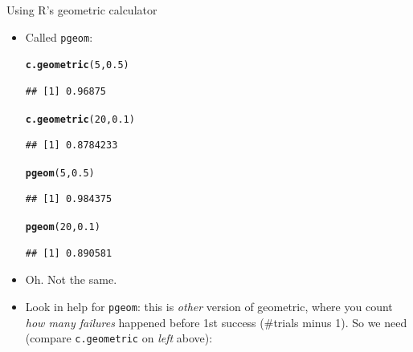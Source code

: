 \documentclass[unknownkeysallowed]{beamer}\usepackage[]{graphicx}\usepackage[]{color}
\makeatletter
\newcommand{\hlnum}[1]{\textcolor[rgb]{0.686,0.059,0.569}{#1}}%
\newcommand{\hlstd}[1]{\textcolor[rgb]{0.345,0.345,0.345}{#1}}%
\newcommand{\hlkwd}[1]{\textcolor[rgb]{0.737,0.353,0.396}{\textbf{#1}}}%
\newenvironment{kframe}{%
 \def\at@end@of@kframe{}%
 \ifinner\ifhmode%
  \def\at@end@of@kframe{\end{minipage}}%
  \begin{minipage}{\columnwidth}%
 \fi\fi%
 \def\FrameCommand##1{\hskip\@totalleftmargin \hskip-\fboxsep
 \colorbox{shadecolor}{##1}\hskip-\fboxsep
     \hskip-\linewidth \hskip-\@totalleftmargin \hskip\columnwidth}%
 \MakeFramed {\advance\hsize-\width
   \@totalleftmargin\z@ \linewidth\hsize
   \@setminipage}}%
 {\par\unskip\endMakeFramed%
 \at@end@of@kframe}
\newenvironment{knitrout}{}{} %
\makeatother
\begin{document}
\begin{frame}[fragile]{Using R's geometric calculator}

  \begin{itemize}
  \item Called \texttt{pgeom}:
\begin{multicols}{2}
\begin{knitrout}
\color{fgcolor}\begin{kframe}
\begin{alltt}
\hlkwd{c.geometric}\hlstd{(}\hlnum{5}\hlstd{,}\hlnum{0.5}\hlstd{)}
\end{alltt}
\begin{verbatim}
## [1] 0.96875
\end{verbatim}
\begin{alltt}
\hlkwd{c.geometric}\hlstd{(}\hlnum{20}\hlstd{,}\hlnum{0.1}\hlstd{)}
\end{alltt}
\begin{verbatim}
## [1] 0.8784233
\end{verbatim}
\end{kframe}
\end{knitrout}
\begin{knitrout}
\color{fgcolor}\begin{kframe}
\begin{alltt}
\hlkwd{pgeom}\hlstd{(}\hlnum{5}\hlstd{,}\hlnum{0.5}\hlstd{)}
\end{alltt}
\begin{verbatim}
## [1] 0.984375
\end{verbatim}
\begin{alltt}
\hlkwd{pgeom}\hlstd{(}\hlnum{20}\hlstd{,}\hlnum{0.1}\hlstd{)}
\end{alltt}
\begin{verbatim}
## [1] 0.890581
\end{verbatim}
\end{kframe}
\end{knitrout}
\end{multicols}
\item Oh. Not the same.
\item Look in help for \texttt{pgeom}: this is \emph{other} version of
  geometric, where you count \emph{how many failures} happened before
  1st success (\#trials minus 1). So we need (compare
  \texttt{c.geometric} on \emph{left}  above):
  

\end{itemize}
\end{frame}
\end{document}
